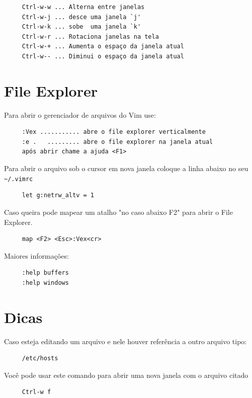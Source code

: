 \documentclass[10pt,a4paper,openany]{book}
\begin{document}
\begin{verbatim}
     Ctrl-w-w ... Alterna entre janelas
     Ctrl-w-j ... desce uma janela `j'
     Ctrl-w-k ... sobe  uma janela `k'
     Ctrl-w-r ... Rotaciona janelas na tela
     Ctrl-w-+ ... Aumenta o espaço da janela atual
     Ctrl-w-- ... Diminui o espaço da janela atual
\end{verbatim}

\section{File Explorer }
\label{File Explorer }
Para abrir o gerenciador de arquivos do Vim use:

\begin{verbatim}
     :Vex ........... abre o file explorer verticalmente
     :e .   ......... abre o file explorer na janela atual
     após abrir chame a ajuda <F1>
\end{verbatim}

Para abrir o arquivo sob o cursor em nova janela coloque a linha abaixo no seu \verb|~/.vimrc|

\begin{verbatim}
     let g:netrw_altv = 1
\end{verbatim}

Caso queira pode mapear um atalho "no caso abaixo F2" para abrir o File Explorer.

\begin{verbatim}
     map <F2> <Esc>:Vex<cr>
\end{verbatim}

Maiores informações:

\begin{verbatim}
     :help buffers
     :help windows
\end{verbatim}

\section{Dicas}
Caso esteja editando um arquivo e nele houver referência a outro arquivo tipo:

\begin{verbatim}
     /etc/hosts
\end{verbatim}

Você pode usar este comando para abrir uma nova janela com o arquivo citado

\begin{verbatim}
     Ctrl-w f
\end{verbatim}
\end{document}
